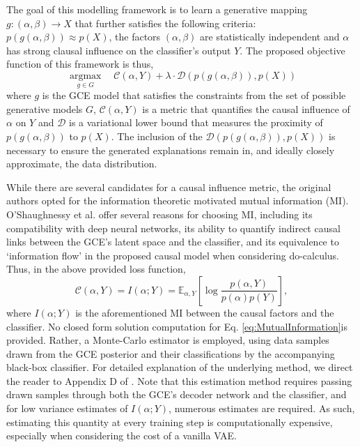 The goal of this modelling framework is to learn a generative mapping $g:(\alpha, \beta)\rightarrow X$ that further satisfies the following criteria: $p(g(\alpha, \beta)) \approx p(X)$, the factors $(\alpha, \beta)$ are statistically independent and $\alpha$ has strong clausal influence on the classifier's output $Y$. The proposed objective function of this framework is thus,
\begin{equation}
\mathop{\text{argmax}}  \limits_{g \in G}  \quad \mathcal{C}(\alpha, Y) + \lambda \cdot \mathcal{D}(p(g(\alpha, \beta)), p(X))
\label{object} 
\end{equation}
where $g$ is the GCE model that satisfies the constraints from the set of possible generative models $G$, $\mathcal{C}(\alpha, Y)$ is a metric that quantifies the causal influence of $\alpha$  on $Y$ and $\mathcal{D}$ is a variational lower bound that measures the proximity of $p(g(\alpha, \beta))$ to $p(X)$. The inclusion of the $\mathcal{D}(p(g(\alpha, \beta)), p(X))$ is necessary to ensure the generated explanations remain in, and ideally closely approximate, the data distribution. 

While there are several candidates for a causal influence metric, the original authors opted for the information theoretic motivated mutual information (MI). O'Shaughnessy et al. offer several reasons for choosing MI, including its compatibility with deep neural networks, its ability to quantify indirect causal links between the GCE's latent space and the classifier, and its equivalence to `information flow' in the proposed causal model when considering do-calculus. Thus, in the above provided loss function,
\begin{equation}\label{eq:MutualInformation}
	\mathcal{C}(\alpha, Y)=I(\alpha;Y)=\mathbb{E}_{\alpha, Y}\left[\log \frac{p(\alpha,Y)}{p(\alpha)p(Y)}\right],
\end{equation}
where $I(\alpha;Y)$ is the aforementioned MI between the causal factors and the classifier. No closed form solution computation for Eq. \ref{eq:MutualInformation}is provided. Rather, a Monte-Carlo estimator is employed, using data samples drawn from the GCE posterior and their classifications by the accompanying black-box classifier. For detailed explanation of the underlying method, we direct the reader to Appendix D of \cite{oshaughnessy2020generative}. Note that this estimation method requires passing drawn samples through both the GCE's decoder network and the classifier, and for low variance estimates of $I(\alpha;Y)$, numerous estimates are required. As such, estimating this quantity at every training step is computationally expensive, especially when considering the cost of a vanilla VAE.

